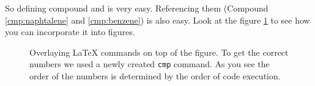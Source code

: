 So defining compound  and  is
very easy.  Referencing them (Compound \ref{cmp:naphtalene} and
\ref{cmp:benzene}) is also easy.
Look at the figure \ref{fig:compeg} to see how you can incorporate it
into figures.

\begin{figure}[h]
    \centering
    \setlength{\tikzunit}{.085\textwidth}
    \caption{Overlaying \LaTeX{} commands on top of the figure. To
    get the correct numbers we used a newly created
    \texttt{cmp} command. As you see the order of the numbers is
    determined by the order of code execution.}
    \label{fig:compeg}
\end{figure}
